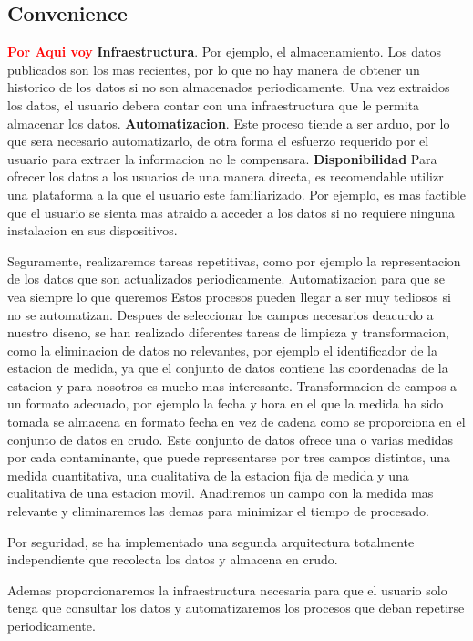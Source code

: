\subsection{Convenience}
\textcolor{red}{\textbf{Por Aqui voy}}
\textbf{Infraestructura}. Por ejemplo, el almacenamiento. Los datos publicados son los mas recientes, por lo que no hay manera de obtener 
un historico de los datos si no son almacenados periodicamente. Una vez extraidos los datos, el usuario debera 
contar con una infraestructura que le permita almacenar los datos.
\textbf{Automatizacion}. Este proceso tiende a ser arduo, por lo que sera necesario automatizarlo, de otra 
forma el esfuerzo requerido por el usuario para extraer la informacion no le compensara. 
\textbf{Disponibilidad} Para ofrecer los datos a los usuarios de una manera directa, es recomendable utilizr una plataforma a la que el usuario
este familiarizado. Por ejemplo, es mas factible que el usuario se sienta mas atraido a acceder a los datos si no requiere
ninguna instalacion en sus dispositivos.

Seguramente, realizaremos tareas repetitivas, como por ejemplo la representacion de los datos que son actualizados periodicamente.
Automatizacion para que se vea siempre lo que queremos
Estos procesos pueden llegar
a ser muy tediosos si no se automatizan.
Despues de seleccionar los campos necesarios deacurdo a nuestro diseno, se han realizado diferentes tareas de limpieza y transformacion,
como la eliminacion de datos no relevantes, por ejemplo el identificador de la estacion de medida, ya que el conjunto de datos
contiene las coordenadas de la estacion y para nosotros es mucho mas interesante.
Transformacion de campos a un formato adecuado, por ejemplo la fecha y hora en el que la medida ha sido tomada se almacena en formato fecha
en vez de cadena como se proporciona en el conjunto de datos en crudo.
Este conjunto de datos ofrece una o varias medidas por cada contaminante, que puede representarse por tres campos distintos, una medida 
cuantitativa, una cualitativa de la estacion fija de medida y una cualitativa de una estacion movil. Anadiremos un campo con la medida
mas relevante y eliminaremos las demas para minimizar el tiempo de procesado.

Por seguridad, se ha implementado una segunda arquitectura totalmente independiente que recolecta los datos y almacena en crudo.

Ademas proporcionaremos
la infraestructura necesaria para que el usuario solo tenga que consultar los datos y automatizaremos los procesos que deban repetirse
periodicamente.


